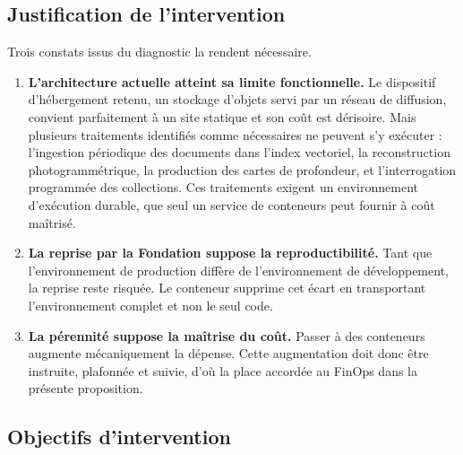\subsection{Justification de l'intervention}

Trois constats issus du diagnostic la rendent nécessaire.

\begin{enumerate}
  \item \textbf{L'architecture actuelle atteint sa limite fonctionnelle.} Le
        dispositif d'hébergement retenu, un stockage d'objets servi par un
        réseau de diffusion, convient parfaitement à un site statique et son
        coût est dérisoire. Mais plusieurs traitements identifiés comme
        nécessaires ne peuvent s'y exécuter : l'ingestion périodique des
        documents dans l'index vectoriel, la reconstruction photogrammétrique,
        la production des cartes de profondeur, et l'interrogation programmée
        des collections. Ces traitements exigent un environnement d'exécution
        durable, que seul un service de conteneurs peut fournir à coût maîtrisé.

  \item \textbf{La reprise par la Fondation suppose la reproductibilité.} Tant
        que l'environnement de production diffère de l'environnement de
        développement, la reprise reste risquée. Le conteneur supprime cet écart
        en transportant l'environnement complet et non le seul code.

  \item \textbf{La pérennité suppose la maîtrise du coût.} Passer à des
        conteneurs augmente mécaniquement la dépense. Cette augmentation doit
        donc être instruite, plafonnée et suivie, d'où la place accordée au
        FinOps dans la présente proposition.
\end{enumerate}

\subsection{Objectifs d'intervention}


